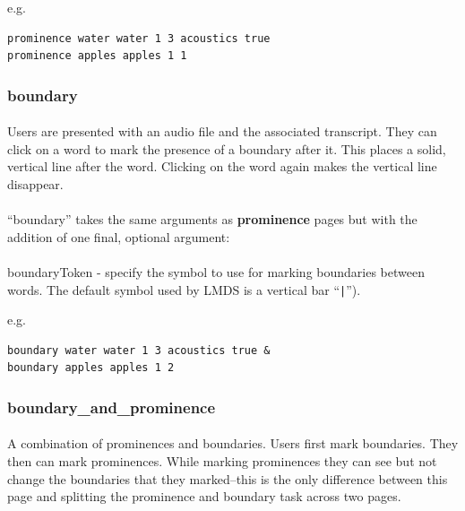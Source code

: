 \documentclass[12pt, oneside]{scrbook}   	%
\begin{document}
e.g.

\begin{lstlisting}
prominence water water 1 3 acoustics true
prominence apples apples 1 1
\end{lstlisting}

\subsubsection{boundary}

\paragraph{}
Users are presented with an audio file and the associated transcript.  They can click on a word to mark the presence of a boundary after it.  This places a solid, vertical line after the word.  Clicking on the word again makes the vertical line disappear.

\paragraph{}
``boundary'' takes the same arguments as \textbf{prominence} pages but with the addition of one final, optional argument:

\paragraph{}
boundaryToken - specify the symbol to use for marking boundaries between words.  The default symbol used by LMDS is a vertical bar ``\texttt{|}'').

e.g.

\begin{lstlisting}
boundary water water 1 3 acoustics true &
boundary apples apples 1 2
\end{lstlisting}


\subsubsection{boundary\_and\_prominence}

\paragraph{}
A combination of prominences and boundaries.  Users first mark boundaries.  They then can mark prominences.  While marking prominences they can see but not change the boundaries that they marked--this is the only difference between this page and splitting the prominence and boundary task across two pages.
\end{document}
